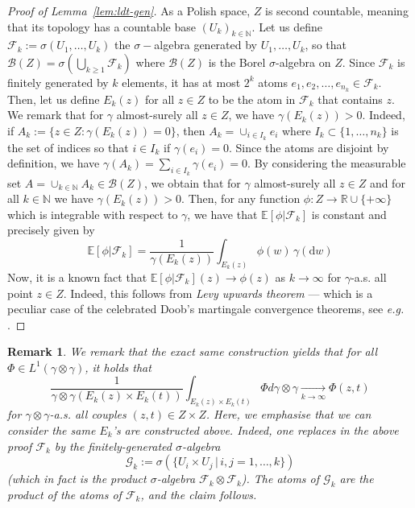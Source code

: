 \documentclass[leqno, 11pt, a4paper]{amsart}
\newtheorem{rem}{Remark}
\theoremstyle{definition}
\newcommand{\R}{\mathbb{R}}
\newcommand{\E}{\mathbb{E}}
\newcommand{\N}{\mathbb{N}}
\newcommand{\cF}{\mathcal{F}}
\newcommand{\cto}[1]{\xrightarrow[#1]{}}
\newcommand{\dd}{\mathrm{d}}
\newcommand{\extendedR}{\R \cup \{+\infty\}}
\begin{document}
\begin{proof}[Proof of Lemma~\ref{lem:ldt-gen}]
	As a Polish space, $Z$ is second countable, meaning that its topology has a countable base  $(U_k)_{k \in \N}$. Let us define $\cF_k := \sigma(U_1, \dots, U_k)$ the $\sigma-$algebra generated by $U_1, \dots, U_k$, so that $\mathcal{B}(Z) = \sigma( \bigcup_{k \geq 1} \cF_k)$ where $\mathcal{B}(Z)$ is the Borel $\sigma$-algebra on $Z$. Since $\cF_k$ is finitely generated by $k$ elements, it has at most $2^k$ atoms $e_1, e_2, \dots, e_{n_k} \in \cF_k$. Then, let us define $E_k(z)$ for all $z \in Z$ to be the atom in $\cF_k$ that contains $z$. We remark that for $\gamma$ almost-surely all $z \in Z$, we have $\gamma(E_k(z)) > 0$. Indeed, if $A_k := \{z \in Z : \gamma(E_k(z)) = 0\}$, then $A_k = \cup_{i \in I_k} e_i$ where $I_k \subset \{1, \dots, n_k\}$ is the set of indices so that $i \in I_k$ if $\gamma(e_i) = 0$. Since the atoms are disjoint by definition, we have $\gamma(A_k) = \sum_{i \in I_k} \gamma(e_i) = 0$. By considering the measurable set $A = \cup_{k \in \N} A_k \in \mathcal{B}(Z)$, we obtain that for $\gamma$ almost-surely all $z \in Z$ and for all $k \in \N$ we have $\gamma(E_k(z)) > 0$. Then, for any function $\phi : Z \to \extendedR$ which is integrable with respect to $\gamma$, we have that $\E[\phi | \cF_k]$ is constant and precisely given by 
	\begin{equation}
		\E[\phi | \cF_k] = \frac{1}{\gamma(E_k(z))} \int_{E_k(z)} \phi(w) \, \gamma(\dd w)
	\end{equation}
	Now, it is a known fact that $\E[\phi | \cF_k](z) \to \phi(z)$ as $k \to \infty$  for $\gamma$-a.s. all point $z \in Z$. Indeed, this follows from \textit{Levy upwards theorem} --- which is a peculiar case of the celebrated Doob's martingale convergence theorems, see \textit{e.g.} \cite{billingsleyProbabilityMeasure1995}.
\end{proof}
\begin{rem}\label{rem:ldt-gen-tensor-product}
	We remark that the exact same construction yields that for all $\Phi \in L^1(\gamma \otimes \gamma)$, it holds that 
	\begin{equation}
		\frac{1}{\gamma \otimes \gamma (E_k(z) \times E_k(t))} \int_{E_k(z) \times E_k(t)} \Phi d \gamma \otimes \gamma \cto{k \to \infty} \Phi(z, t)
	\end{equation}
	for $\gamma \otimes \gamma$-a.s. all couples $(z, t) \in Z \times Z$. Here, we emphasise that we can consider the \textit{same } $E_k$'s are constructed above. Indeed, one replaces in the above proof $\cF_k$ by the finitely-generated $\sigma$-algebra $$\mathcal{G}_k := \sigma(\{ U_i \times U_j \,|\, i,j=1, \dots, k\})$$ (which in fact is the product $\sigma$-algebra $\cF_k \otimes \cF_k$). The atoms of $\mathcal{G}_k$ are the product of the atoms of $\cF_k$, and the claim follows.
\end{rem}
\end{document}
